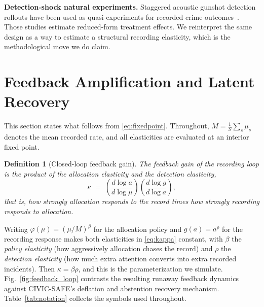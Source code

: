 \documentclass[journal,10pt,twocolumn]{IEEEtran}
\newtheorem{definition}{Definition}
\begin{document}
\textbf{Detection-shock natural experiments.} Staggered acoustic gunshot
detection rollouts have been used as quasi-experiments for recorded crime
outcomes~\cite{connealy2024staggered}. Those studies estimate reduced-form
treatment effects. We reinterpret the same design as a way to estimate a
structural recording elasticity, which is the methodological move we do claim.

\section{Feedback Amplification and Latent Recovery}
\label{sec:theory}
This section states what follows from \eqref{eq:fixedpoint}. Throughout,
$M = \frac{1}{S}\sum_{s} \mu_s$ denotes the mean recorded rate, and all
elasticities are evaluated at an interior fixed point.

\begin{definition}[Closed-loop feedback gain]
\label{def:kappa}
The feedback gain of the recording loop is the product of the allocation
elasticity and the detection elasticity,
\begin{equation}
\label{eq:kappa}
\kappa \;=\; \left(\frac{d \log a}{d \log \mu}\right)
             \left(\frac{d \log g}{d \log a}\right),
\end{equation}
that is, how strongly allocation responds to the record times how strongly
recording responds to allocation.
\end{definition}

Writing $\varphi(\mu) = (\mu/M)^{\beta}$ for the allocation policy and
$g(a) = a^{\rho}$ for the recording response makes both elasticities in
\eqref{eq:kappa} constant, with $\beta$ the \emph{policy elasticity} (how
aggressively allocation chases the record) and $\rho$ the \emph{detection
elasticity} (how much extra attention converts into extra recorded incidents).
Then $\kappa = \beta\rho$, and this is the parameterization we simulate.
Fig.~\ref{fig:feedback_loop} contrasts the resulting runaway feedback dynamics
against CIVIC-SAFE's deflation and abstention recovery mechanism.
Table~\ref{tab:notation} collects the symbols used throughout.
\end{document}
